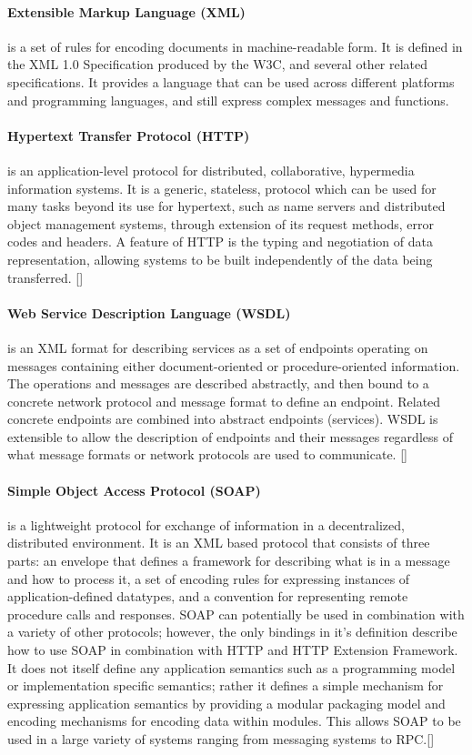 \paragraph{Extensible Markup Language (XML)}
is a set of rules for encoding documents in machine-readable form. It is defined in the XML 1.0 Specification produced by the W3C, and several other related specifications. It provides a language that can be used across different platforms and programming languages, and still express complex messages and functions.

\paragraph{Hypertext Transfer Protocol (HTTP)} 
is an application-level protocol for distributed, collaborative, hypermedia information systems. It is a generic, stateless, protocol which can be used for many tasks beyond its use for hypertext, such as name servers and distributed object management systems, through extension of its request methods, error codes and headers. A feature of HTTP is the typing and negotiation of data representation, allowing systems to be built independently of the data being transferred. [\citet{HTTP}]

\paragraph{Web Service Description Language (WSDL)}
is an XML format for describing services as a set of endpoints operating on messages containing either document-oriented or procedure-oriented information. The operations and messages are described abstractly, and then bound to a concrete network protocol and message format to define an endpoint. Related concrete endpoints are combined into abstract endpoints (services). WSDL is extensible to allow the description of endpoints and their messages regardless of what message formats or network protocols are used to communicate. [\citet{WSDL}]

\paragraph{Simple Object Access Protocol (SOAP)}
is a lightweight protocol for exchange of information in a decentralized, distributed environment. It is an XML based protocol that consists of three parts: an envelope that defines a framework for describing what is in a message and how to process it, a set of encoding rules for expressing instances of application-defined datatypes, and a convention for representing remote procedure calls and responses. SOAP can potentially be used in combination with a variety of other protocols; however, the only bindings in it's definition describe how to use SOAP in combination with HTTP and HTTP Extension Framework. It does not itself define any application semantics such as a programming model or implementation specific semantics; rather it defines a simple mechanism for expressing application semantics by providing a modular packaging model and encoding mechanisms for encoding data within modules. This allows SOAP to be used in a large variety of systems ranging from messaging systems to RPC.[\citet{SOAP}]

